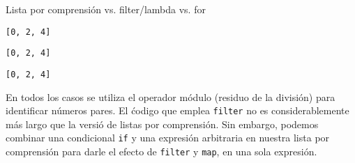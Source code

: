 \begin{code} Lista por comprensión vs. filter/lambda vs. for

\begin{Shaded}
\begin{Highlighting}[]
\NormalTok{[x } \NormalTok{(}\NormalTok{) }\OperatorTok{\%} \OperatorTok{==}\NormalTok{]}
\end{Highlighting}
\end{Shaded}

\begin{verbatim}
[0, 2, 4]
\end{verbatim}

\begin{Shaded}
\begin{Highlighting}[]
\NormalTok{(}\NormalTok{(}\OperatorTok{\%}\OperatorTok{==}\NormalTok{, }\NormalTok{(}\NormalTok{)))}
\end{Highlighting}
\end{Shaded}

\begin{verbatim}
[0, 2, 4]
\end{verbatim}

\begin{Shaded}
\begin{Highlighting}[]
\OperatorTok{=}\NormalTok{ []}
 \NormalTok{(}\NormalTok{):}
    \OperatorTok{\%}\OperatorTok{==}\NormalTok{:}
\end{Highlighting}
\end{Shaded}

\begin{verbatim}
[0, 2, 4]
\end{verbatim}
\label{code:listaPorComprension3}
\end{code}

En todos los casos se utiliza el operador módulo (residuo de la
división) para identificar números pares. El ćodigo que emplea
\texttt{filter} no es considerablemente más largo que la versió de
listas por comprensión. Sin embargo, podemos combinar una condicional
\texttt{if} y una expresión arbitraria en nuestra lista por comprensión
para darle el efecto de \texttt{filter} y \texttt{map}, en una sola
expresión.\\


